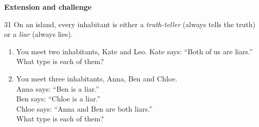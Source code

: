 \documentclass[11pt]{article}
\newenvironment{probbox}[2]{\begin{probboxT}{#1}{#2}}{\end{probboxT}}
\newcommand{\dividerbar}[1]{\par\vspace{0.6em}\noindent
  \begin{tcolorbox}[enhanced,frame hidden,interior hidden,borderline west={5pt}{0pt}{ProbBlue},
    colback=white,left=12pt,right=12pt,top=5pt,bottom=5pt,arc=4pt]
  {\large\bfseries\color{ProbBlue} #1}\end{tcolorbox}\vspace{0.4em}}
\begin{document}
\clearpage
\dividerbar{Extension and challenge}


\begin{probbox}{31}{\relax}
On an island, every inhabitant is either a \emph{truth-teller} (always tells the truth) or a \emph{liar} (always lies).
\begin{enumerate}[label=\alph*),leftmargin=1.6em,itemsep=1pt,topsep=2pt]
  \item You meet two inhabitants, Kate and Leo. Kate says: ``Both of us are liars.'' What type is each of them?
  \item You meet three inhabitants, Anna, Ben and Chloe.\\
  Anna says: ``Ben is a liar.''\\
  Ben says: ``Chloe is a liar.''\\
  Chloe says: ``Anna and Ben are both liars.''\\
  What type is each of them?
\end{enumerate}
\end{probbox}
\end{document}

